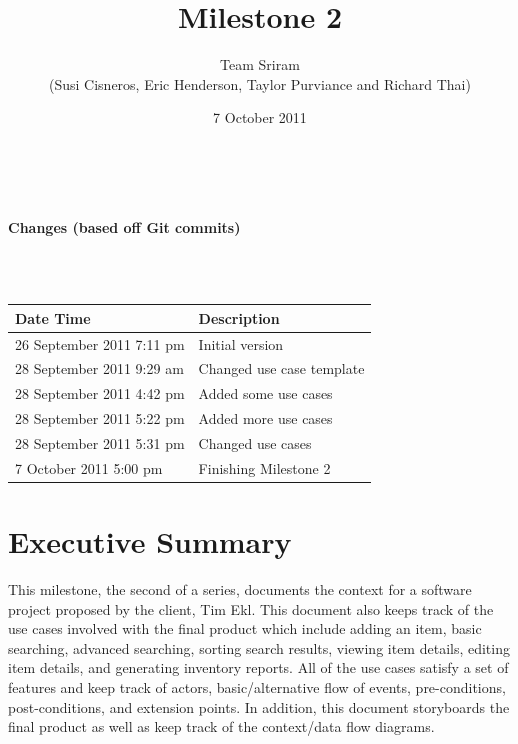 \documentclass{article}
\begin{document}
\setlength{\voffset}{3.5in}
\title{Milestone 2}
\author{Team Sriram\\
(Susi Cisneros, Eric Henderson, Taylor Purviance and Richard Thai)}
\date{7 October 2011}
\maketitle
\clearpage
\setlength{\voffset}{0pt}
\tableofcontents
\clearpage
~\\
\begin{Large}\textbf{Changes (based off Git commits)}\end{Large}\\
~\\
\begin{tabular}{ | p{2in} | p{4.5in} | }
\hline
\textbf{Date Time} & \textbf{Description}\\
\hline
\hline
26 September 2011 7:11 pm & Initial version\\
\hline
28 September 2011 9:29 am & Changed use case template\\
\hline
28 September 2011 4:42 pm & Added some use cases\\
\hline
28 September 2011 5:22 pm & Added more use cases\\
\hline
28 September 2011 5:31 pm & Changed use cases\\
\hline
7 October 2011 5:00 pm & Finishing Milestone 2\\
\hline
\end{tabular}
\clearpage

\section{Executive Summary}
This milestone, the second of a series, documents the context for a software project proposed by the client, Tim Ekl. This document also keeps track of the use cases involved with the final product which include adding an item, basic searching, advanced searching, sorting search results, viewing item details, editing item details, and generating inventory reports. All of the use cases satisfy a set of features and keep track of actors, basic/alternative flow of events, pre-conditions, post-conditions, and extension points. In addition, this document storyboards the final product as well as keep track of the context/data flow diagrams.
\end{document}

